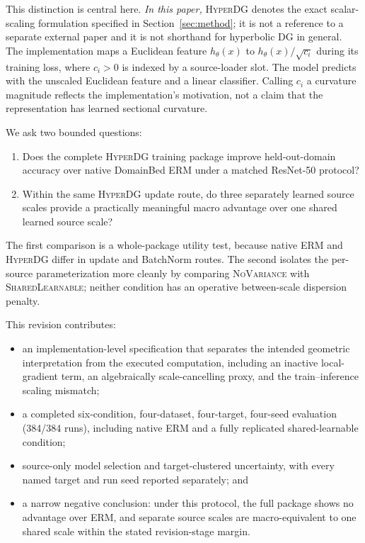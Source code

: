 \documentclass[10pt]{article}
\newcommand{\method}{\textsc{HyperDG}}
\newcommand{\shared}{\textsc{SharedLearnable}}
\newcommand{\novar}{\textsc{NoVariance}}
\begin{document}
This distinction is central here. \emph{In this paper,} \method{} denotes the
exact scalar-scaling formulation specified in Section~\ref{sec:method}; it is
not a reference to a separate external paper and it is not shorthand for
hyperbolic DG in general. The implementation maps a Euclidean feature
$h_\theta(x)$ to
$h_\theta(x)/\sqrt{c_i}$ during its training loss, where $c_i>0$ is indexed by
a source-loader slot. The model predicts with the unscaled Euclidean feature
and a linear classifier. Calling $c_i$ a curvature magnitude reflects the
implementation's motivation, not a claim that the representation has learned
sectional curvature.

We ask two bounded questions:
\begin{enumerate}
    \item Does the complete \method{} training package improve held-out-domain
    accuracy over native DomainBed ERM under a matched ResNet-50 protocol?
    \item Within the same \method{} update route, do three separately learned
    source scales provide a practically meaningful macro advantage over one
    shared learned source scale?
\end{enumerate}
The first comparison is a whole-package utility test, because native ERM and
\method{} differ in update and BatchNorm routes. The second isolates the
per-source parameterization more cleanly by comparing \novar{} with \shared{};
neither condition has an operative between-scale dispersion penalty.

This revision contributes:
\begin{itemize}
    \item an implementation-level specification that separates the intended
    geometric interpretation from the executed computation, including an
    inactive local-gradient term, an algebraically scale-cancelling proxy, and
    the train--inference scaling mismatch;
    \item a completed six-condition, four-dataset, four-target, four-seed
    evaluation (384/384 runs), including native ERM and a fully replicated
    shared-learnable condition;
    \item source-only model selection and target-clustered uncertainty,
    with every named target and run seed reported separately; and
    \item a narrow negative conclusion: under this protocol, the full package
    shows no advantage over ERM, and separate source scales are macro-equivalent
    to one shared scale within the stated revision-stage margin.
\end{itemize}
\end{document}
